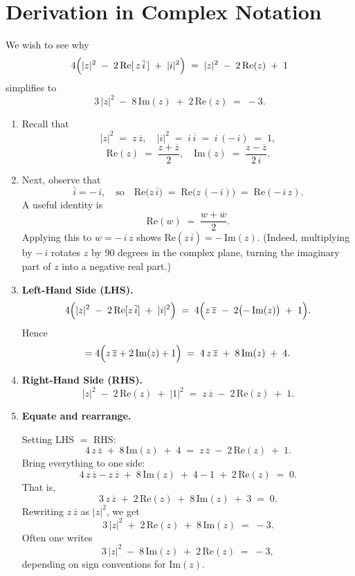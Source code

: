 \documentclass[12pt]{article}
\theoremstyle{definition} %
\theoremstyle{plain} %
\begin{document}
\section*{Derivation in Complex Notation}

We wish to see why
\[
4\Bigl(\lvert z\rvert^{2} \;-\; 2\,\mathrm{Re}[\,z\,\overline{i}\,] \;+\; \lvert i\rvert^{2}\Bigr)
\;=\;
\lvert z\rvert^{2} \;-\; 2\,\mathrm{Re}(z) \;+\; 1
\]
simplifies to
\[
3\,\lvert z\rvert^{2} \;-\;8\,\mathrm{Im}(z) \;+\;2\,\mathrm{Re}(z)
\;=\;
-3.
\]

\begin{enumerate}
\item
Recall that 
\[
\lvert z\rvert^{2} \;=\; z\,\overline{z}, 
\quad
\lvert i\rvert^{2} \;=\; i\,\overline{i} \;=\; i\,(-\,i) \;=\;1,
\]
\[
\mathrm{Re}(z) \;=\;\frac{z + \overline{z}}{2},
\quad
\mathrm{Im}(z) \;=\;\frac{z - \overline{z}}{2\,i}.
\]

\item
Next, observe that 
\[
\overline{i} = -\,i,
\quad
\text{so}
\quad
\mathrm{Re}\bigl(z\,\overline{i}\bigr) 
\;=\;
\mathrm{Re}\bigl(z\,(-\,i)\bigr)
\;=\;
\mathrm{Re}(-\,i\,z).
\]
A useful identity is
\[
\mathrm{Re}(w) \;=\;\frac{w + \overline{w}}{2}.
\]
Applying this to $w = -\,i\,z$ shows 
\(\mathrm{Re}(z\,\overline{i}) = -\,\mathrm{Im}(z).\)
(Indeed, multiplying by $-\,i$ rotates $z$ by 90 degrees in the complex plane, turning the imaginary part of $z$ into a negative real part.)

\item
\textbf{Left-Hand Side (LHS).}
\[
4\Bigl(\lvert z\rvert^{2} \;-\; 2\,\mathrm{Re}[z\,\overline{i}] \;+\;\lvert i\rvert^{2}\Bigr)
\;=\;
4\Bigl(z\,\overline{z} \;-\;2\bigl(-\,\mathrm{Im}(z)\bigr)\;+\;1\Bigr).
\]
Hence
\[
= 4\Bigl(z\,\overline{z} + 2\,\mathrm{Im}(z) + 1\Bigr)
\;=\;
4\,z\,\overline{z} \;+\; 8\,\mathrm{Im}(z) \;+\;4.
\]

\item
\textbf{Right-Hand Side (RHS).}
\[
\lvert z\rvert^{2} \;-\;2\,\mathrm{Re}(z) \;+\;\lvert 1\rvert^{2}
\;=\;
z\,\overline{z} \;-\;2\,\mathrm{Re}(z) \;+\;1.
\]

\item
\textbf{Equate and rearrange.}

Setting LHS $=$ RHS:
\[
4\,z\,\overline{z} \;+\;8\,\mathrm{Im}(z) \;+\;4
\;=\;
z\,\overline{z} \;-\;2\,\mathrm{Re}(z) \;+\;1.
\]
Bring everything to one side:
\[
4\,z\,\overline{z} - z\,\overline{z}
\;+\;
8\,\mathrm{Im}(z)
\;+\;
4 - 1
\;+\;
2\,\mathrm{Re}(z)
\;=\;0.
\]
That is,
\[
3\,z\,\overline{z} \;+\; 2\,\mathrm{Re}(z) \;+\; 8\,\mathrm{Im}(z) \;+\;3 \;=\;0.
\]
Rewriting $z\,\overline{z}$ as $\lvert z\rvert^{2}$, we get
\[
3\,\lvert z\rvert^{2} \;+\;2\,\mathrm{Re}(z) \;+\;8\,\mathrm{Im}(z)
\;=\;-3.
\]
Often one writes
\[
3\,\lvert z\rvert^{2} 
\;-\;8\,\mathrm{Im}(z) 
\;+\;2\,\mathrm{Re}(z) 
\;=\;-3,
\]
depending on sign conventions for $\mathrm{Im}(z)$.
\end{enumerate}
\end{document}
